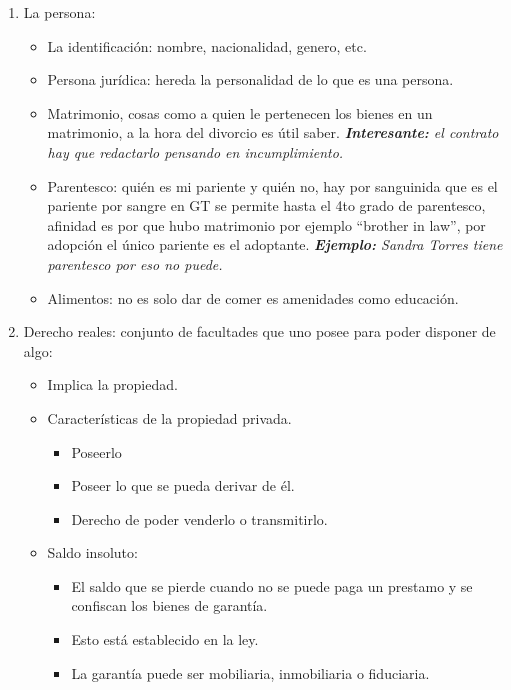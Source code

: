 \begin{enumerate}
    \item La persona: 
        \begin{itemize}
            \item La identificación: nombre, nacionalidad, genero, etc.
            \item Persona jurídica: hereda la personalidad de lo que es una persona.
            \item Matrimonio, cosas como a quien le pertenecen los bienes en un matrimonio, a la hora del divorcio es útil saber. \emph{\textbf{Interesante:} el contrato hay que redactarlo pensando en incumplimiento.}
            \item Parentesco: quién es mi pariente y quién no, hay por sanguinida que es el pariente por sangre en GT se permite hasta el 4to grado de parentesco, afinidad es por que hubo matrimonio por ejemplo ``brother in law'', por adopción el único pariente es el adoptante. \emph{\textbf{Ejemplo: }Sandra Torres tiene parentesco por eso no puede.}
            \item Alimentos: no es solo dar de comer es amenidades como educación.
        \end{itemize}
    
    
    \item Derecho reales: conjunto de facultades que uno posee para poder disponer de algo:
        \begin{itemize}
            \item Implica la propiedad.
            \item Características de la propiedad privada.
                \begin{itemize}
                    \item Poseerlo
                    \item Poseer lo que se pueda derivar de él.
                    \item Derecho de poder venderlo o transmitirlo.
                \end{itemize}
            
            \item Saldo insoluto: 
                \begin{itemize}
                    \item El saldo que se pierde cuando no se puede paga un prestamo y se confiscan los bienes de garantía.
                    \item Esto está establecido en la ley.
                    \item La garantía puede ser mobiliaria, inmobiliaria o fiduciaria.
                \end{itemize}
            

\end{itemize}
\end{enumerate}
